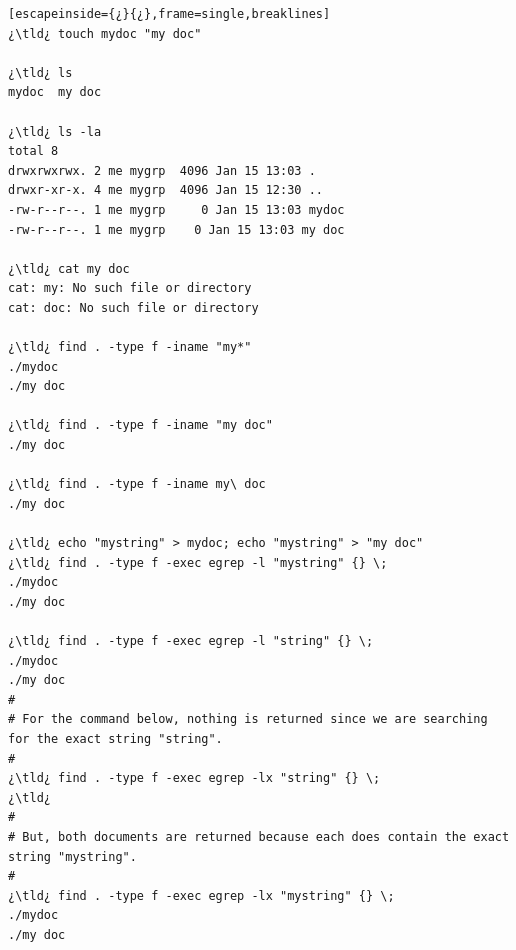 \begin{lstlisting}[escapeinside={¿}{¿},frame=single,breaklines]
¿\tld¿ touch mydoc "my doc"

¿\tld¿ ls
mydoc  my doc

¿\tld¿ ls -la
total 8
drwxrwxrwx. 2 me mygrp  4096 Jan 15 13:03 .
drwxr-xr-x. 4 me mygrp  4096 Jan 15 12:30 ..
-rw-r--r--. 1 me mygrp     0 Jan 15 13:03 mydoc
-rw-r--r--. 1 me mygrp    0 Jan 15 13:03 my doc

¿\tld¿ cat my doc
cat: my: No such file or directory
cat: doc: No such file or directory

¿\tld¿ find . -type f -iname "my*"
./mydoc
./my doc

¿\tld¿ find . -type f -iname "my doc"
./my doc

¿\tld¿ find . -type f -iname my\ doc
./my doc

¿\tld¿ echo "mystring" > mydoc; echo "mystring" > "my doc"
¿\tld¿ find . -type f -exec egrep -l "mystring" {} \;
./mydoc
./my doc

¿\tld¿ find . -type f -exec egrep -l "string" {} \;
./mydoc
./my doc
#
# For the command below, nothing is returned since we are searching for the exact string "string".
#
¿\tld¿ find . -type f -exec egrep -lx "string" {} \; 
¿\tld¿
#
# But, both documents are returned because each does contain the exact string "mystring".
#
¿\tld¿ find . -type f -exec egrep -lx "mystring" {} \;
./mydoc
./my doc
\end{lstlisting}


